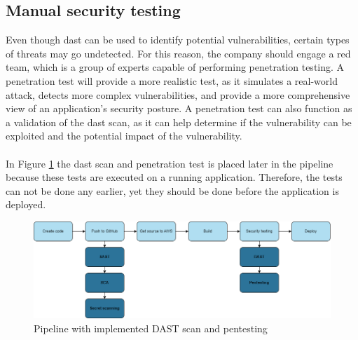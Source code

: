 \subsection{Manual security testing}


Even though \acrshort{dast} can be used to identify potential vulnerabilities, certain types of threats may go undetected. For this reason, the company should engage a red team, which is a group of experts capable of performing penetration testing. A penetration test will provide a more realistic test, as it simulates a real-world attack, detects more complex vulnerabilities, and provide a more comprehensive view of an application's security posture. A penetration test can also function as a validation of the \acrshort{dast} scan, as it can help determine if the vulnerability can be exploited and the potential impact of the vulnerability. \cite{dastpentesting}
\\~\\
In Figure \ref{fig: Pipeline with implemented DAST scan and pentesting} the \acrshort{dast} scan and penetration test is placed later in the pipeline because these tests are executed on a running application. Therefore, the tests can not be done any earlier, yet they should be done before the application is deployed.
\vspace{2mm}
\begin{figure}[H]
    \centering
    \includegraphics[width=0.8\columnwidth]{Images/pipeline5.png}
    \caption{Pipeline with implemented DAST scan and pentesting}
    \label{fig: Pipeline with implemented DAST scan and pentesting}
\end{figure}